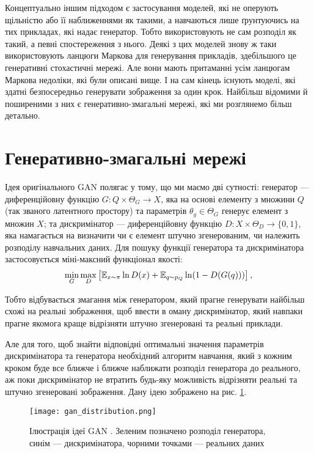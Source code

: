 Концептуально іншим підходом є застосування моделей, які
не оперують щільністю або її наближеннями як такими, а
навчаються лише ґрунтуючись на тих прикладах, які надає
генератор. Тобто використовують не сам розподіл як такий, а
певні спостереження з нього. Деякі з цих моделей знову ж таки
використовують ланцюги Маркова для генерування прикладів,
здебільшого це генеративні стохастичні мережі. Але вони мають
притаманні усім ланцюгам Маркова недоліки, які були описані вище.
І на сам кінець існують моделі, які здатні безпосередньо
генерувати зображення за один крок. Найбільш відомими й поширеними з них
є генеративно-змагальні мережі, які ми розглянемо більш детально.

\section{Генеративно-змагальні мережі}

Ідея оригінального GAN  \cite{pix2pix}
полягає у тому, що ми маємо дві сутності:
генератор --- диференційовну функцію $G: Q \times \Theta_G \rightarrow X$, яка
на основі елементу з множини $Q$ (так званого латентного простору)
та параметрів $\theta_g \in \Theta_G$
генерує елемент з множин $X$; та дискримінатор
--- диференційовну функцію $D: X \times \Theta_D \rightarrow \{0, 1\}$, яка
намагається на визначити чи є елемент штучно згенерованим, чи
належить розподілу навчальних даних. Для пошуку функції
генератора та дискримінатора застосовується міні-максний функціонал якості:
\begin{equation} \label{eq:gan_criterion}
    \min\limits_{G}\max\limits_{D} \left[
        \operatorname{\mathbb{E}}_{x \sim \pi} \ln D(x) +
        \operatorname{\mathbb{E}}_{q \sim p_{Q}} \ln (1 - D(G(q))) \right],
\end{equation}

Тобто відбувається змагання між генератором, який прагне генерувати найбільш
схожі на реальні зображення, щоб ввести в оману дискримінатор,
який навпаки прагне якомога краще відрізняти штучно згенеровані та
реальні приклади.

Але для того, щоб знайти відповідні оптимальні значення
параметрів дискримінатора та генератора необхідний алгоритм навчання,
який з кожним кроком буде все ближче і ближче наближати розподіл
генератора до реального, аж поки дискримінатор не втратить будь-яку можливість
відрізняти реальні та штучно згенеровані зображення. Дану ідею
зображено на рис. \ref{fig:gan}.

\begin{figure}[h]
    \centering
    \texttt{[image: gan\_distribution.png]}
    \caption{Ілюстрація ідеї GAN \cite{goodfellow2014generative}.
        Зеленим позначено розподіл генератора,
        синім --- дискримінатора,
        чорними точками --- реальних даних}
    \label{fig:gan}
\end{figure}

